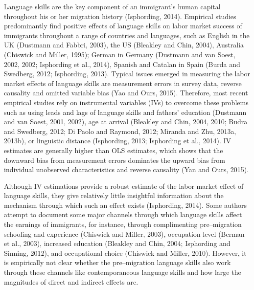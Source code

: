 \documentclass[12pt,a4paper]{article}
\begin{document}
Language skills are the key component of an immigrant's human capital throughout his or her migration history (Isphording, 2014). Empirical studies predominantly find positive effects of language skills on labor market success of immigrants throughout a range of countries and languages, such as English in the UK (Dustmann and Fabbri, 2003), the US (Bleakley and Chin, 2004), Australia (Chiswick and Miller, 1995); German in Germany (Dustmann and van Soest, 2002, 2002; Isphording et al., 2014), Spanish and Catalan in Spain (Burda and Swedberg, 2012; Isphording, 2013). Typical issues emerged in measuring the labor market effects of language skills are measurement errors in survey data, reverse causality and omitted variable bias (Yao and Ours, 2015). Therefore, most recent empirical studies rely on instrumental variables (IVs) to overcome these problems such as using leads and lags of language skills and fathers' education (Dustmann and van Soest, 2001, 2002), age at arrival (Bleakley and Chin, 2004, 2010; Budra and Swedberg, 2012; Di Paolo and Raymond, 2012; Miranda and Zhu, 2013a, 2013b), or linguistic distance (Isphording, 2013; Isphording et al., 2014). IV estimates are generally higher than OLS estimates, which shows that the downward bias from measurement errors dominates the upward bias from individual unobserved characteristics and reverse causality (Yan and Ours, 2015).

Although IV estimations provide a robust estimate of the labor market effect of language skills, they give relatively little insightful information about the mechanism through which such an effect exists (Isphording, 2014). Some authors attempt to document some major channels through which language skills affect the earnings of immigrants, for instance, through complimenting pre--migration schooling and experience (Chiswick and Miller, 2003), occupation level (Berman et al., 2003), increased education (Bleakley and Chin, 2004; Isphording and Sinning, 2012), and occupational choice (Chiswick and Miller, 2010). However, it is empirically not clear whether the pre--migration language skills also work through these channels like contemporaneous language skills and how large the magnitudes of direct and indirect effects are.


\end{document}
